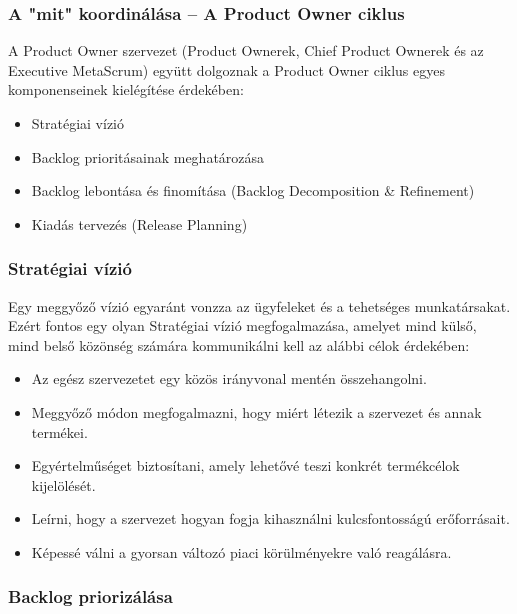 \documentclass[12pt,a4paper,parskip=full]{scrartcl}
\begin{document}
\subsubsection{A "mit" koordinálása – A Product Owner ciklus}\label{coordinating-the-what}

A Product Owner szervezet (Product Ownerek, Chief Product Ownerek és az Executive MetaScrum) együtt dolgoznak a Product Owner ciklus egyes komponenseinek kielégítése érdekében:

\begin{itemize}
\itemsep1pt\parskip0pt
\item
 Stratégiai vízió
\item
 Backlog prioritásainak meghatározása
\item
 Backlog lebontása és finomítása (Backlog Decomposition \& Refinement)
\item
 Kiadás tervezés (Release Planning)
\end{itemize}

\subsubsection{Stratégiai vízió}\label{strategic-vision}

Egy meggyőző vízió egyaránt vonzza az ügyfeleket és a tehetséges munkatársakat. Ezért fontos egy olyan Stratégiai vízió megfogalmazása, amelyet mind külső, mind belső közönség számára kommunikálni kell az alábbi célok érdekében:

\begin{itemize}
\itemsep1pt\parskip0pt
\item
 Az egész szervezetet egy közös irányvonal mentén összehangolni.
\item
 Meggyőző módon megfogalmazni, hogy miért létezik a szervezet és annak termékei.
\item
 Egyértelműséget biztosítani, amely lehetővé teszi konkrét termékcélok kijelölését.
\item
 Leírni, hogy a szervezet hogyan fogja kihasználni kulcsfontosságú erőforrásait.
\item
 Képessé válni a gyorsan változó piaci körülményekre való reagálásra.
\end{itemize}

\subsubsection{Backlog priorizálása}\label{backlog-prioritization}
\end{document}
